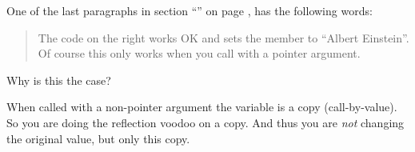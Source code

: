 \begin{Exercise}[title={Pointers and reflection},difficulty=1]
\label{ex:pointers and reflection}
\Question
One of the last paragraphs in section ``''
on page \pageref{sec:introspection and reflection}, has
the following words:
\begin{quote}
The code on the right works OK and sets the member 
to ``Albert Einstein''. Of course this only works when you call 
with a pointer argument.
\end{quote}
Why is this the case?
\end{Exercise}

\begin{Answer}
\Question
When called with a non-pointer argument the variable is a copy (call-by-value). So you
are doing the reflection voodoo on a copy. And thus you are \emph{not}
changing the original value, but only this copy.
\end{Answer}
